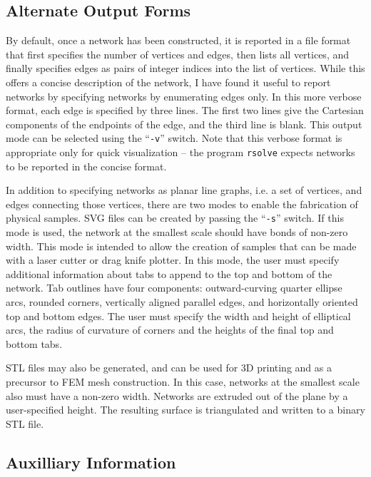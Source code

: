 \documentclass{article}
\begin{document}
\subsection{Alternate Output Forms}

By default, once a network has been constructed, it is reported in a file format
that first specifies the number of vertices and edges, then lists all vertices,
and finally specifies edges as pairs of integer indices into the list of
vertices. While this offers a concise description of the network, I have found
it useful to report networks by specifying networks by enumerating edges only.
In this more verbose format, each edge is specified by three lines. The first
two lines give the Cartesian components of the endpoints of the edge, and
the third line is blank. This output mode can be selected using the 
``\texttt{-v}'' switch. Note that this verbose format is appropriate only
for quick visualization -- the program \texttt{rsolve} expects networks to
be reported in the concise format.

In addition to specifying networks as planar line graphs, i.e. a set of vertices, and edges connecting those vertices, there are two modes to enable the
fabrication of physical samples. SVG files can be created by passing the
``\texttt{-s}'' switch. If this mode is used, the network at the smallest scale 
should have bonds of non-zero width. This mode is intended to allow the creation
of samples that can be made with a laser cutter or drag knife plotter. In this
mode, the user must specify additional information about tabs to append to
the top and bottom of the network. Tab outlines have four components:
outward-curving quarter ellipse arcs, rounded corners, vertically aligned
parallel edges, and horizontally oriented top and bottom edges. The user
must specify the width and height of elliptical arcs, the radius of curvature
of corners and the heights of the final top and bottom tabs.

STL files may also be generated, and can be used for 3D printing and as
a precursor to FEM mesh construction. In this case, networks at the smallest
scale also must have a non-zero width. Networks are extruded out of the plane
by a user-specified height. The resulting surface is triangulated and written
to a binary STL file. 

\subsection{Auxilliary Information}
\end{document}
